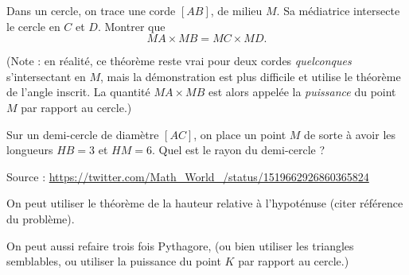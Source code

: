 \begin{exo}
Dans un cercle, on trace une corde $[AB]$, de milieu $M$. Sa médiatrice intersecte le cercle en $C$ et $D$.
Montrer que
\[ MA\times MB = MC\times MD.\]
\begin{center}
\end{center}
(Note : en réalité, ce théorème reste vrai pour deux cordes \emph{quelconques} s'intersectant en $M$, mais la démonstration est plus difficile et utilise le théorème de l'angle inscrit. La quantité $MA\times MB$ est alors appelée la \emph{puissance} du point $M$ par rapport au cercle.)
\end{exo}









\begin{exo}
Sur un demi-cercle de diamètre $[AC]$, on place un point $M$ de sorte à avoir les longueurs $HB=3$ et $HM=6$. Quel est le rayon du demi-cercle ?
\begin{center}
\end{center}
\begin{sol}
Source : \url{https://twitter.com/Math_World_/status/1519662926860365824}

On peut utiliser le théorème de la hauteur relative à l'hypoténuse (citer référence du problème).

On peut aussi refaire trois fois Pythagore, (ou bien utiliser les triangles semblables, ou utiliser la puissance du point $K$ par rapport au cercle.)
\end{sol}
\end{exo}











